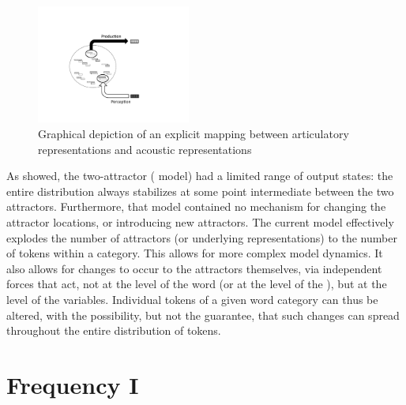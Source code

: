 \begin{figure}[h]
\includegraphics[width=0.45\textwidth]{figures/SeparateReps.pdf}\caption{\label{fig:P-toP-mapping}Graphical depiction of an explicit mapping
between articulatory representations and acoustic representations}
\end{figure}

As  showed, the two-attractor (
model) had a limited range of output states: the entire distribution
always stabilizes at some point intermediate between the two attractors.
Furthermore, that model contained no mechanism for changing the attractor
locations, or introducing new attractors. The current model effectively
explodes the number of attractors (or underlying representations)
to the number of tokens within a category. This allows for more complex
model dynamics. It also allows for changes to occur to the attractors
themselves, via independent forces that act, not at the level of the
word (or at the level of the ), but at the level of the 
variables. Individual tokens of a given word category can thus be
altered, with the possibility, but not the guarantee, that such changes
can spread throughout the entire distribution of tokens.

\section{\label{sec:Frequency-I}Frequency I}

